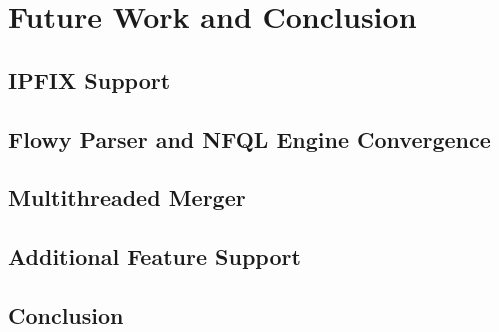 \chapter{Future Work and Conclusion}\label{ch:future-work}

\section{IPFIX Support}\label{sec:ipfix-support}
\section{Flowy Parser and NFQL Engine Convergence}\label{sec:ipfix-support}
\section{Multithreaded Merger}\label{sec:multithreaded-merger}
\section{Additional Feature Support}\label{sec:multithreaded-merger}
\section{Conclusion}\label{sec:conclusion}
